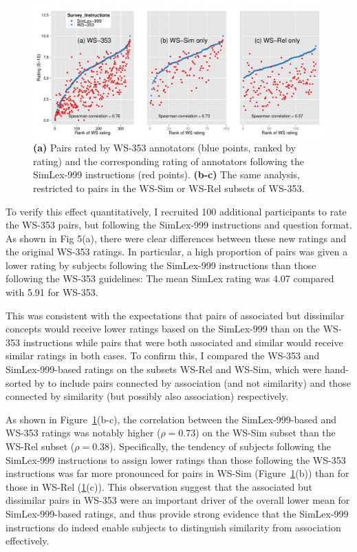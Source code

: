 \begin{figure}[ht]  \includegraphics[width =\textwidth]{Chapter_2/Figure_6_CL} \caption{\label{fig5} {\bf(a)} Pairs rated by WS-353 annotators (blue points, ranked by rating) and the corresponding rating of annotators following the SimLex-999 instructions (red points). {\bf(b-c)} The same analysis, restricted to pairs in the WS-Sim or WS-Rel subsets of WS-353.}\end{figure}  



To verify this effect quantitatively, I recruited 100 additional participants to rate the WS-353 pairs, but following the SimLex-999 instructions and question format. As shown in Fig 5(a), there were clear differences between these new ratings and the original WS-353 ratings. In particular, a high proportion of pairs was given a lower rating by subjects following the SimLex-999 instructions than those following the WS-353 guidelines: The mean SimLex rating was 4.07 compared with 5.91 for WS-353. 



This was consistent with the expectations that pairs of associated but dissimilar concepts would receive lower ratings based on the SimLex-999 than on the WS-353 instructions while pairs that were both associated and similar would receive similar ratings in both cases. To confirm this, I compared the WS-353 and SimLex-999-based ratings on the subsets WS-Rel and WS-Sim, which were hand-sorted by \cite{agirre2009study} to include pairs connected by association (and not similarity) and those connected by similarity (but possibly also association) respectively.  



As shown in Figure~\ref{fig5}(b-c), the correlation between the SimLex-999-based and WS-353 ratings was notably higher (\(\rho=0.73\)) on the WS-Sim subset than the WS-Rel subset (\(\rho=0.38\)). Specifically, the tendency of subjects following the SimLex-999 instructions to assign lower ratings than those following the WS-353 instructions was far more pronounced for pairs in WS-Sim (Figure~\ref{fig5}(b)) than for those in WS-Rel (\ref{fig5}(c)). This observation suggest that the associated but dissimilar pairs in WS-353 were an important driver of the overall lower mean for SimLex-999-based ratings, and thus provide strong evidence that the SimLex-999 instructions do indeed enable subjects to distinguish similarity from association effectively. 


